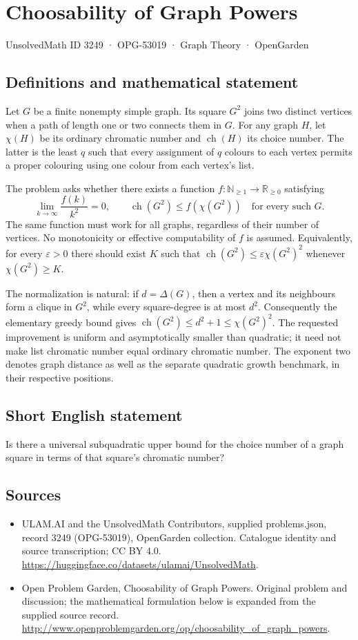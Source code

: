 \documentclass[11pt,a4paper]{article}
\begin{document}
\section*{Choosability of Graph Powers}\label{3249}
{\small UnsolvedMath ID 3249 · OPG-53019 · Graph Theory · OpenGarden}
\subsection{Definitions and mathematical statement}
Let $G$ be a finite nonempty simple graph. Its square $G^2$ joins two
distinct vertices when a path of length one or two connects them in $G$.
For any graph $H$, let $\chi(H)$ be its ordinary chromatic number and
$\operatorname{ch}(H)$ its choice number. The latter is the least $q$
such that every assignment of $q$ colours to each vertex permits a proper
colouring using one colour from each vertex's list.

The problem asks whether there exists a function
$f:\mathbb N_{\ge1}\to\mathbb R_{\ge0}$ satisfying
\[
 \lim_{k\to\infty}\frac{f(k)}{k^2}=0,
 \qquad
 \operatorname{ch}(G^2)\le f(\chi(G^2))
 \quad\text{for every such }G.
\]
The same function must work for all graphs, regardless of their number
of vertices. No monotonicity or effective computability of $f$ is assumed.
Equivalently, for every $\varepsilon>0$ there should exist $K$ such that
$\operatorname{ch}(G^2)\le\varepsilon\chi(G^2)^2$ whenever
$\chi(G^2)\ge K$.

The normalization is natural: if $d=\Delta(G)$, then a vertex and its
neighbours form a clique in $G^2$, while every square-degree is at most
$d^2$. Consequently the elementary greedy bound gives
$\operatorname{ch}(G^2)\le d^2+1\le\chi(G^2)^2$.
The requested improvement is uniform and asymptotically smaller than
quadratic; it need not make list chromatic number equal ordinary
chromatic number. The exponent two denotes graph distance as well as
the separate quadratic growth benchmark, in their respective positions.
\subsection{Short English statement}
Is there a universal subquadratic upper bound for the choice number of a graph square in terms of that square’s chromatic number?
\subsection{Sources}
\begin{itemize}
\item[S1] ULAM.AI and the UnsolvedMath Contributors, supplied problems.json, record 3249 (OPG-53019), OpenGarden collection. Catalogue identity and source transcription; CC BY 4.0.
\url{https://huggingface.co/datasets/ulamai/UnsolvedMath}.
\item[S2] Open Problem Garden, Choosability of Graph Powers. Original problem and discussion; the mathematical formulation below is expanded from the supplied source record.
\url{http://www.openproblemgarden.org/op/choosability_of_graph_powers}.
\end{itemize}
\end{document}
